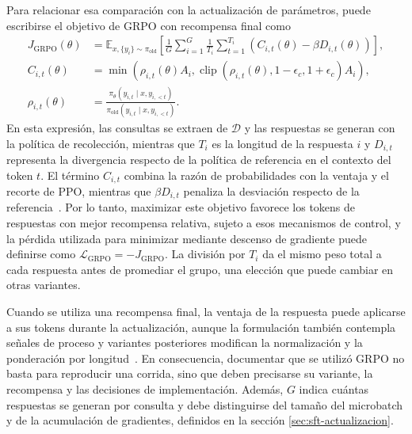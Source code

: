 Para relacionar esa comparación con la actualización de parámetros, puede escribirse el objetivo de GRPO con recompensa final como
\begin{equation}
\begin{aligned}
J_{\mathrm{GRPO}}(\theta)
&=\mathbb{E}_{x,\{y_i\}\sim\pi_{\mathrm{old}}}\left[
\frac{1}{G}\sum_{i=1}^{G}\frac{1}{T_i}\sum_{t=1}^{T_i}
\left(C_{i,t}(\theta)-\beta D_{i,t}(\theta)\right)\right],\\
C_{i,t}(\theta)
&=\min\left(\rho_{i,t}(\theta)A_i,
\operatorname{clip}(\rho_{i,t}(\theta),1-\epsilon_c,1+\epsilon_c)A_i\right),\\
\rho_{i,t}(\theta)
&=\frac{\pi_\theta(y_{i,t}\mid x,y_{i,<t})}
{\pi_{\mathrm{old}}(y_{i,t}\mid x,y_{i,<t})}.
\end{aligned}
\label{eq:objetivo-grpo}
\end{equation}
En esta expresión, las consultas se extraen de $\mathcal{D}$ y las respuestas se generan con la política de recolección, mientras que $T_i$ es la longitud de la respuesta $i$ y $D_{i,t}$ representa la divergencia respecto de la política de referencia en el contexto del token $t$. El término $C_{i,t}$ combina la razón de probabilidades con la ventaja y el recorte de PPO, mientras que $\beta D_{i,t}$ penaliza la desviación respecto de la referencia~\cite{shao2024deepseekmath}. Por lo tanto, maximizar este objetivo favorece los tokens de respuestas con mejor recompensa relativa, sujeto a esos mecanismos de control, y la pérdida utilizada para minimizar mediante descenso de gradiente puede definirse como $\mathcal{L}_{\mathrm{GRPO}}=-J_{\mathrm{GRPO}}$. La división por $T_i$ da el mismo peso total a cada respuesta antes de promediar el grupo, una elección que puede cambiar en otras variantes.

Cuando se utiliza una recompensa final, la ventaja de la respuesta puede aplicarse a sus tokens durante la actualización, aunque la formulación también contempla señales de proceso y variantes posteriores modifican la normalización y la ponderación por longitud~\cite{shao2024deepseekmath,deepseek2025r1}. En consecuencia, documentar que se utilizó GRPO no basta para reproducir una corrida, sino que deben precisarse su variante, la recompensa y las decisiones de implementación. Además, $G$ indica cuántas respuestas se generan por consulta y debe distinguirse del tamaño del microbatch y de la acumulación de gradientes, definidos en la sección \ref{sec:sft-actualizacion}.

